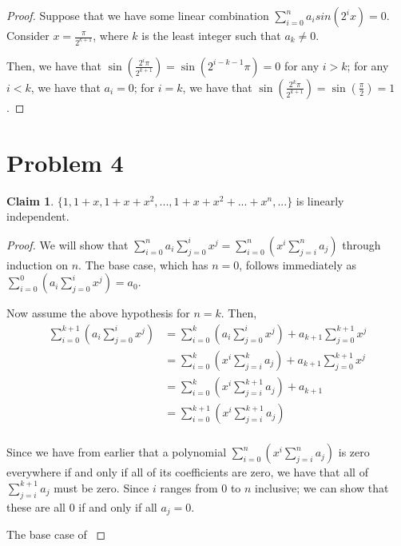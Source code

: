 \documentclass[12pt,letterpaper]{article}
\theoremstyle{definition}
\newtheorem*{claim}{Claim}
\begin{document}
\begin{proof}
  Suppose that we have some linear combination $\sum_{i=0}^na_isin(2^ix) = 0$.
  Consider $x = \frac{\pi}{2^{k+1}}$, where $k$ is the least integer such that
  $a_k \neq 0$.

  Then, we have that $\sin(\frac{2^i\pi}{2^{k+1}}) = \sin(2^{i - k - 1}\pi) = 0$ for
  any $i > k$; for any $i < k$, we have that $a_i = 0$; for $i = k$, we have
  that $\sin(\frac{2^k\pi}{2^{k+1}}) = \sin(\frac{\pi}{2}) = 1$.
\end{proof}

\section*{Problem 4}

\begin{claim}
  $\{1, 1 + x, 1 + x + x^2, ..., 1 + x + x^2 + ... + x^n, ...\}$ is linearly independent.
\end{claim}

\begin{proof}


  We will show that $\sum_{i=0}^na_i\sum_{j=0}^ix^j =
  \sum_{i=0}^{n}(x^i\sum_{j=i}^{n}a_j)$ through induction on $n$. The base case,
  which has $n = 0$, follows immediately as $\sum_{i=0}^0(a_i\sum_{j=0}^ix^j) =
  a_0$.

  Now assume the above hypothesis for $n = k$. Then,
  \begin{align*}
    \sum_{i=0}^{k+1}(a_i\sum_{j=0}^ix^j) &= \sum_{i=0}^k(a_i\sum_{j=0}^ix^j) + a_{k+1}\sum_{j=0}^{k+1}x^j \\
                                       &= \sum_{i=0}^{k}(x^{i}\sum_{j=i}^{k}a_j) + a_{k+1}\sum_{j=0}^{k+1}x^j \\
                                         &= \sum_{i=0}^k(x^i\sum_{j=i}^{k+1}a_j) + a_{k+1}  \\
                                         &= \sum_{i=0}^{k+1}(x^i\sum_{j=i}^{k+1}a_j)  \\
  \end{align*}

  Since we have from earlier that a polynomial
  $\sum_{i=0}^{n}(x^i\sum_{j=i}^{n}a_j)$ is zero everywhere if and only if
  all of its coefficients are zero, we have that all of $\sum_{j=i}^{k+1}a_j$
  must be zero. Since $i$ ranges from 0 to $n$ inclusive; we can show that these
  are all $0$ if and only if all $a_j = 0$.

  The base case of $$
\end{proof}
\end{document}

